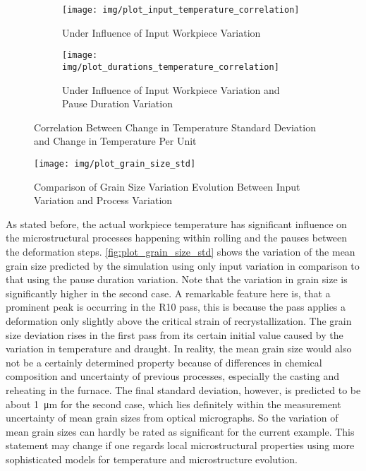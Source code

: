 \begin{figure}
    \begin{subfigure}{\linewidth}
        \centering
        \texttt{[image: img/plot\_input\_temperature\_correlation]}
        \caption{Under Influence of Input Workpiece Variation}
        \label{fig:plot_input_temperature_correlation}
    \end{subfigure}
    \begin{subfigure}{\linewidth}
        \centering
        \texttt{[image: img/plot\_durations\_temperature\_correlation]}
        \caption{Under Influence of Input Workpiece Variation and Pause Duration Variation}
        \label{fig:plot_durations_temperature_correlation}
    \end{subfigure}
    \caption{Correlation Between Change in Temperature Standard Deviation and Change in Temperature Per Unit}
\end{figure}

\begin{figure}
    \centering
    \texttt{[image: img/plot\_grain\_size\_std]}
    \caption{Comparison of Grain Size Variation Evolution Between Input Variation and Process Variation}
    \label{fig:plot_grain_size_std}
\end{figure}

As stated before, the actual workpiece temperature has significant influence on the microstructural processes happening within rolling and the pauses between the deformation steps.
\autoref{fig:plot_grain_size_std} shows the variation of the mean grain size predicted by the simulation using only input variation in comparison to that using the pause duration variation.
Note that the variation in grain size is significantly higher in the second case.
A remarkable feature here is, that a prominent peak is occurring in the R10 pass, this is because the pass applies a deformation only slightly above the critical strain of recrystallization.
The grain size deviation rises in the first pass from its certain initial value caused by the variation in temperature and draught.
In reality, the mean grain size would also not be a certainly determined property because of differences in chemical composition and uncertainty of previous processes, especially the casting and reheating in the furnace.
The final standard deviation, however, is predicted to be about \qty{1}{\micro\meter} for the second case, which lies definitely within the measurement uncertainty of mean grain sizes from optical micrographs.
So the variation of mean grain sizes can hardly be rated as significant for the current example.
This statement may change if one regards local microstructural properties using more sophisticated models for temperature and microstructure evolution.

